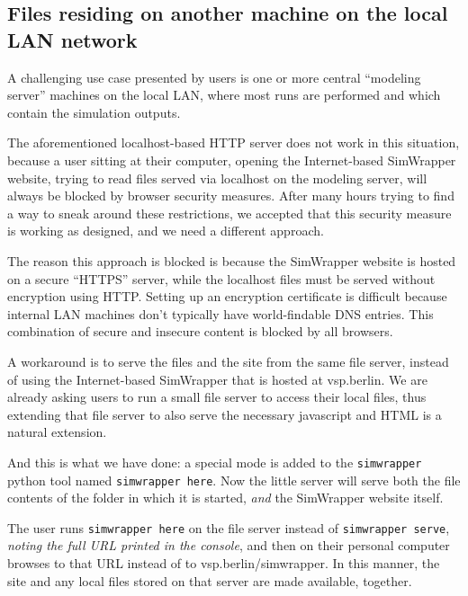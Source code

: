 
\hypertarget{files-residing-on-another-machine-on-the-local-lan-network}{%
\subsection{Files residing on another machine on the local LAN
network}\label{files-residing-on-another-machine-on-the-local-lan-network}}

A challenging use case presented by users is one or more central
``modeling server'' machines on the local LAN, where most runs are
performed and which contain the simulation outputs.

The aforementioned localhost-based HTTP server does not work in this
situation, because a user sitting at their computer, opening the
Internet-based SimWrapper website, trying to read files served via
localhost on the modeling server, will always be blocked by browser
security measures. After many hours trying to find a way to sneak around
these restrictions, we accepted that this security measure is working as
designed, and we need a different approach.

The reason this approach is blocked is because the SimWrapper website is
hosted on a secure ``HTTPS'' server, while the localhost files must be
served without encryption using HTTP. Setting up an encryption
certificate is difficult because internal LAN machines don't typically
have world-findable DNS entries. This combination of secure and insecure
content is blocked by all browsers.

A workaround is to serve the files and the site from the same file
server, instead of using the Internet-based SimWrapper that is hosted at
vsp.berlin. We are already asking users to run a small file server to
access their local files, thus extending that file server to also serve
the necessary javascript and HTML is a natural extension.

And this is what we have done: a special mode is added to the
\texttt{simwrapper} python tool named \texttt{simwrapper\ here}. Now the
little server will serve both the file contents of the folder in which
it is started, \emph{and} the SimWrapper website itself.

The user runs \texttt{simwrapper\ here} on the file server instead of
\texttt{simwrapper\ serve}, \emph{noting the full URL printed in the
console}, and then on their personal computer browses to that URL
instead of to vsp.berlin/simwrapper. In this manner, the site and any
local files stored on that server are made available, together.

